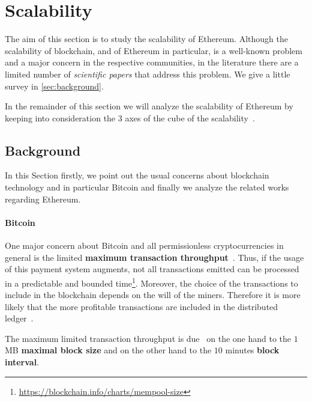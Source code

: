 \section{Scalability}
\label{sec:scalability}
The aim of this section is to study the scalability of Ethereum.
Although the scalability of blockchain, and of Ethereum in particular, is a
well-known problem and a major concern in the respective communities, in the
literature there are a limited number of \emph{scientific papers} that
address this problem.
We give a little survey in \autoref{sec:background}.

In the remainder of this section we will analyze the
scalability of Ethereum by
keeping into consideration the 3 axes of the cube of the
scalability~\cite{bib:art-of-scalability}.


\subsection{Background}
\label{sec:background}

In this Section firstly, we point out the usual concerns about blockchain
technology and in particular Bitcoin and finally we analyze the related works
regarding Ethereum.

\paragraph{Bitcoin} 
One major concern about Bitcoin and all permissionless cryptocurrencies
in general is the limited \textbf{maximum transaction
throughput}~\cite{bib:blockchain-challenges-opportunites-survey, bib:taxonomy,
bib:scaling-croman}.
Thus, if the usage of this payment system augments,
not all transactions emitted can be processed
in a predictable and bounded
time\footnote{\url{https://blockchain.info/charts/mempool-size}}.
Moreover, the choice of the transactions
to include in the blockchain depends on the will of the miners.
Therefore it is more likely that the more profitable transactions are included
in the distributed
ledger~\cite{bib:blockchain-challenges-opportunites-survey,wood2018ethereum}.

The maximum limited transaction throughput is
due~\cite{bib:ghost, bib:scaling-croman} on the one
hand to the $1$ MB \textbf{maximal block size} and on the other
hand to the $10$ minutes \textbf{block interval}.

